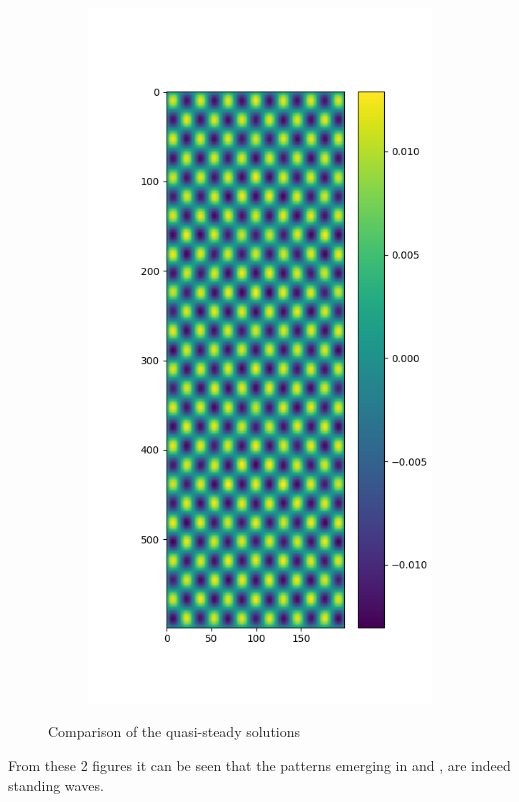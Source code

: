 \documentclass{article}
\begin{document}
\begin{figure}[H]
\begin{subfigure}{.5\textwidth}
		\includegraphics[width=.9\linewidth]{3steadyc=2.png}
	\end{subfigure}
	\caption{Comparison of the quasi-steady solutions}
\end{figure}
From these 2 figures it can be seen that the patterns emerging in  and , are indeed standing waves.
    
\end{document}
